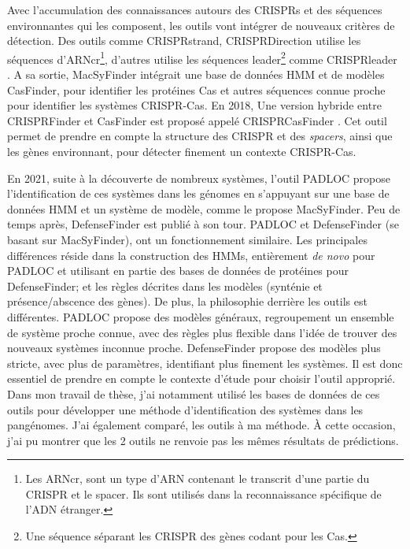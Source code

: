 Avec l'accumulation des connaissances autours des CRISPRs et des séquences environnantes qui les composent, les outils vont intégrer de nouveaux critères de détection. Des outils comme CRISPRstrand\cite{alkhnbashi_crisprstrand_2014}, CRISPRDirection\cite{biswas_accurate_2014} utilise les séquences d'ARNcr\footnote{Les ARNcr, sont un type d'ARN contenant le transcrit d'une partie du CRISPR et le spacer. Ils sont utilisés dans la reconnaissance spécifique de l'ADN étranger.}, d'autres utilise les séquences leader\footnote{Une séquence séparant les CRISPR des gènes codant pour les Cas.} comme CRISPRleader \cite{alkhnbashi_characterizing_2016}. A sa sortie, MacSyFinder \cite{abby_macsyfinder_2014} intégrait une base de données HMM et de modèles CasFinder, pour identifier les protéines Cas et autres séquences connue proche pour identifier les systèmes CRISPR-Cas. En 2018, Une version hybride entre CRISPRFinder et CasFinder est proposé appelé CRISPRCasFinder \cite{couvin_crisprcasfinder_2018}. Cet outil permet de prendre en compte la structure des CRISPR et des \textit{spacers}, ainsi que les gènes environnant, pour détecter finement un contexte CRISPR-Cas.


En 2021, suite à la découverte de nombreux systèmes, l'outil PADLOC \cite{payne_identification_2021} propose l'identification de ces systèmes dans les génomes en s'appuyant sur une base de données HMM et un système de modèle, comme le propose MacSyFinder. Peu de temps après, DefenseFinder \cite{tesson_systematic_2022} est publié à son tour. PADLOC et DefenseFinder (se basant sur MacSyFinder), ont un fonctionnement similaire. Les principales différences réside dans la construction des HMMs, entièrement \textit{de novo} pour PADLOC et utilisant en partie des bases de données de protéines pour DefenseFinder; et les règles décrites dans les modèles (synténie et présence/abscence des gènes). De plus, la philosophie derrière les outils est différentes. PADLOC propose des modèles généraux, regroupement un ensemble de système proche connue, avec des règles plus flexible dans l'idée de trouver des nouveaux systèmes inconnue proche. DefenseFinder propose des modèles plus stricte, avec plus de paramètres, identifiant plus finement les systèmes. Il est donc essentiel de prendre en compte le contexte d'étude pour choisir l'outil approprié. Dans mon travail de thèse, j'ai notamment utilisé les bases de données de ces outils pour développer une méthode d'identification des systèmes dans les pangénomes. J'ai également comparé, les outils à ma méthode. À cette occasion, j'ai pu montrer que les 2 outils ne renvoie pas les mêmes résultats de prédictions. 

